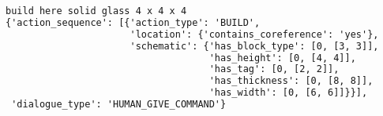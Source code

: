 \begin{lstlisting}[language=TeX]
build here solid glass 4 x 4 x 4
{'action_sequence': [{'action_type': 'BUILD',
                      'location': {'contains_coreference': 'yes'},
                      'schematic': {'has_block_type': [0, [3, 3]],
                                    'has_height': [0, [4, 4]],
                                    'has_tag': [0, [2, 2]],
                                    'has_thickness': [0, [8, 8]],
                                    'has_width': [0, [6, 6]]}}],
 'dialogue_type': 'HUMAN_GIVE_COMMAND'}

\end{lstlisting}